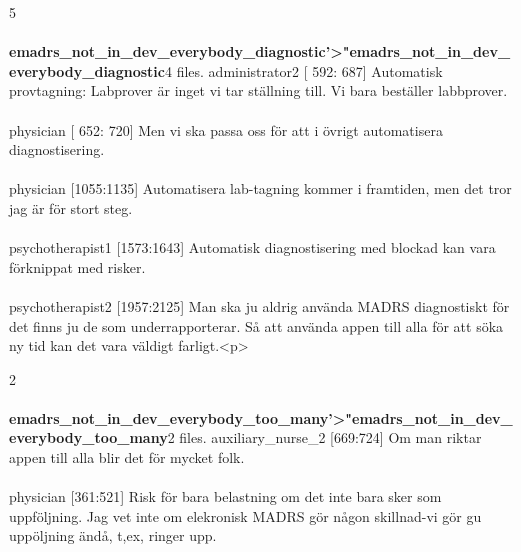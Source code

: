 \documentclass[12pt,a4paper,oneside]{article}
\begin{document}
5 \\\ \\{\bf emadrs\_not\_in\_dev\_everybody\_diagnostic'>"emadrs\_not\_in\_dev\_everybody\_diagnostic}4 files.
 administrator2 [ 592: 687] 
Automatisk provtagning: Labprover är inget vi tar ställning till. Vi bara beställer labbprover. %
\\\ \\
 physician [ 652: 720] 
Men vi ska passa oss f{\"o}r att i {\"o}vrigt automatisera diagnostisering.  %
\\\ \\
 physician [1055:1135] 
Automatisera lab-tagning kommer i framtiden, men det tror jag är f{\"o}r stort steg. %
\\\ \\
 psychotherapist1 [1573:1643] 
Automatisk diagnostisering med blockad kan vara f{\"o}rknippat med risker. %
\\\ \\
 psychotherapist2 [1957:2125] 
Man ska ju aldrig använda MADRS diagnostiskt f{\"o}r det finns ju de som underrapporterar. S{\aa} att använda appen till alla f{\"o}r att s{\"o}ka ny tid kan det vara väldigt farligt.<p> %

2 \\\ \\{\bf emadrs\_not\_in\_dev\_everybody\_too\_many'>"emadrs\_not\_in\_dev\_everybody\_too\_many}2 files.
 auxiliary\_nurse\_2 [669:724] 
Om man riktar appen till alla blir det f{\"o}r mycket folk. %
\\\ \\
 physician [361:521] 
Risk f{\"o}r bara belastning om det inte bara sker som uppf{\"o}ljning. Jag vet inte om elekronisk MADRS g{\"o}r n{\aa}gon skillnad-vi g{\"o}r gu upp{\"o}ljning änd{\aa}, t,ex, ringer upp. %
\end{document}
